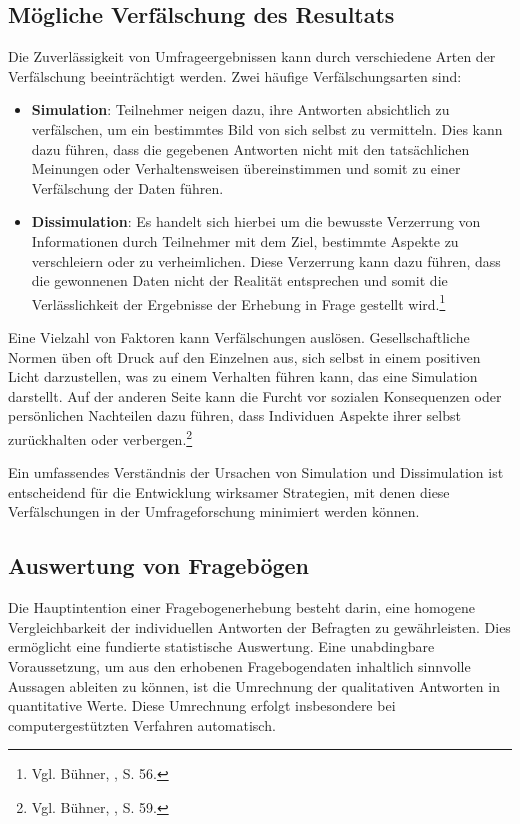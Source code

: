 \subsection{Mögliche Verfälschung des Resultats}
Die Zuverlässigkeit von Umfrageergebnissen kann durch verschiedene Arten der Verfälschung beeinträchtigt werden. Zwei
häufige Verfälschungsarten sind:
\begin{itemize}
    \item \textbf{Simulation}: Teilnehmer neigen dazu, ihre Antworten absichtlich zu verfälschen, um ein bestimmtes Bild
    von sich selbst zu vermitteln. Dies kann dazu führen, dass die gegebenen Antworten nicht mit den tatsächlichen
    Meinungen oder Verhaltensweisen übereinstimmen und somit zu einer Verfälschung der Daten führen.

    \item \textbf{Dissimulation}: Es handelt sich hierbei um die bewusste Verzerrung von Informationen durch Teilnehmer
    mit dem Ziel, bestimmte Aspekte zu verschleiern oder zu verheimlichen. Diese Verzerrung kann dazu führen, dass die
    gewonnenen Daten nicht der Realität entsprechen und somit die Verlässlichkeit der Ergebnisse der Erhebung in Frage
    gestellt wird.\footnote{Vgl. Bühner, \cite{Einfuehrung in die Test und Fragebogenkonstruktion}, S. 56.}\\
\end{itemize}

Eine Vielzahl von Faktoren kann Verfälschungen auslösen. Gesellschaftliche Normen üben oft Druck auf den Einzelnen aus,
sich selbst in einem positiven Licht darzustellen, was zu einem Verhalten führen kann, das eine Simulation darstellt. Auf
der anderen Seite kann die Furcht vor sozialen Konsequenzen oder persönlichen Nachteilen dazu führen, dass Individuen
Aspekte ihrer selbst zurückhalten oder verbergen.\footnote{Vgl. Bühner, \cite{Einfuehrung in die Test und Fragebogenkonstruktion}, S. 59.}

Ein umfassendes Verständnis der Ursachen von Simulation und Dissimulation ist entscheidend für die Entwicklung wirksamer
Strategien, mit denen diese Verfälschungen in der Umfrageforschung minimiert werden können.

\subsection{Auswertung von Fragebögen}
Die Hauptintention einer Fragebogenerhebung besteht darin, eine homogene Vergleichbarkeit der individuellen Antworten der
Befragten zu gewährleisten. Dies ermöglicht eine fundierte statistische Auswertung. Eine unabdingbare Voraussetzung, um
aus den erhobenen Fragebogendaten inhaltlich sinnvolle Aussagen ableiten zu können, ist die Umrechnung der qualitativen
Antworten in quantitative Werte. Diese Umrechnung erfolgt insbesondere bei computergestützten Verfahren automatisch.

